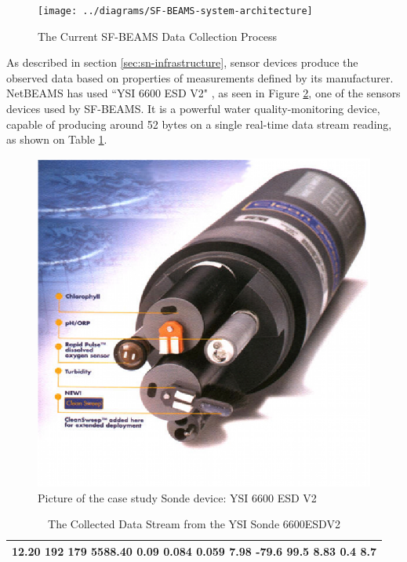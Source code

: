 \begin{figure}[!b]
  \centering
  \texttt{[image: ../diagrams/SF-BEAMS-system-architecture]}
  \caption{The Current SF-BEAMS Data Collection Process}
  \label{fig:SF-BEAMS-system-architecture}
\end{figure}

As described in section \ref{sec:sn-infrastructure}, sensor devices produce
the observed data based on properties of measurements defined by its
manufacturer. NetBEAMS has used ``YSI 6600 ESD V2" \cite{YSI-Sonde}, as seen in
Figure \ref{fig:ysi-device}, one of the sensors devices used by SF-BEAMS. It is a
powerful water quality-monitoring device, capable of producing around 52 bytes
on a single real-time data stream reading, as shown on Table
\ref{tab:ysi-data-stream}.

\begin{figure}[!b]
  \centering
  \includegraphics[scale=0.7]{../diagrams/ysi-device}
  \caption{Picture of the case study Sonde device: YSI 6600 ESD V2}
  \label{fig:ysi-device}
\end{figure}

\begin{table}
    \begin{center}
        \begin{tabular}{|l|}\hline
  12.20    192    179 5588.40   0.09   0.084   0.059  7.98   -79.6   99.5  8.83  0.4     8.7\\\hline
        \end{tabular}
    \end{center}
    \label{tab:ysi-data-stream}
    \caption{The Collected Data Stream from the YSI Sonde 6600ESDV2}
\end{table}

